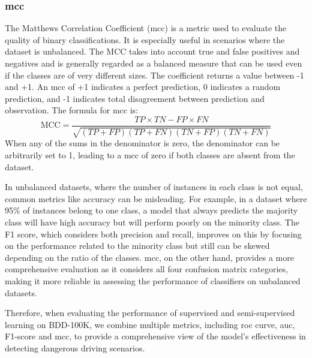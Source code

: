\subsubsection*{\ac{mcc}}
The Matthews Correlation Coefficient (\ac{mcc}) is a metric used to evaluate the 
quality of binary classifications. It is especially useful in scenarios where 
the dataset is unbalanced. The MCC takes into account true and false positives 
and negatives and is generally regarded as a balanced measure that can be used 
even if the classes are of very different sizes. 
The coefficient returns a value between -1 and +1. An \ac{mcc} of +1 indicates a 
perfect prediction, 0 indicates a random prediction, and -1 indicates total 
disagreement between prediction and observation.
The formula for \ac{mcc} is:
\begin{equation*}
    \text{MCC} = \frac{TP \times TN - FP \times FN}{\sqrt{(TP + FP)(TP + FN)(TN + FP)(TN + FN)}}
\end{equation*}
When any of the sums in the denominator is zero, the denominator can be 
arbitrarily set to 1, leading to a \ac{mcc} of zero if both classes are absent 
from the dataset.

In unbalanced datasets, where the number of instances in each class is not equal, 
common metrics like accuracy can be misleading. For example, in a dataset where 
95\% of instances belong to one class, a model that always predicts the majority 
class will have high accuracy but will perform poorly on the minority class. 
The F1 score, which considers both precision and recall, improves on this by 
focusing on the performance related to the minority class but still can be skewed 
depending on the ratio of the classes.
\ac{mcc}, on the other hand, provides a more comprehensive evaluation as it 
considers all four confusion matrix categories, making it more reliable in 
assessing the performance of classifiers on unbalanced datasets.

Therefore, when evaluating the performance of supervised and semi-supervised 
learning on BDD-100K, we combine multiple metrics, including \ac{roc} curve, 
\ac{auc}, F1-score and \ac{mcc}, to provide a comprehensive view of the model's 
effectiveness in detecting dangerous driving scenarios.